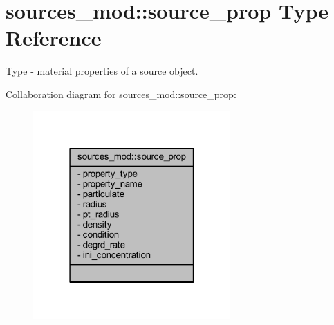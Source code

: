 \hypertarget{structsources__mod_1_1source__prop}{}\section{sources\+\_\+mod\+:\+:source\+\_\+prop Type Reference}
\label{structsources__mod_1_1source__prop}


Type -\/ material properties of a source object.  




Collaboration diagram for sources\+\_\+mod\+:\+:source\+\_\+prop\+:\nopagebreak
\begin{figure}[H]
\begin{center}
\leavevmode
\includegraphics[width=214pt]{structsources__mod_1_1source__prop__coll__graph}
\end{center}
\end{figure}
